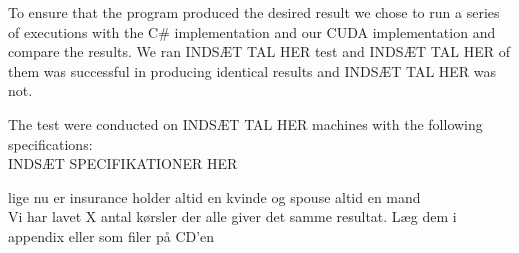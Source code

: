 To ensure that the program produced the desired result we chose to run a series of executions with the C\# implementation and our CUDA implementation and compare the results. We ran INDSÆT TAL HER test and INDSÆT TAL HER of them was successful in producing identical results and INDSÆT TAL HER was not. 

The test were conducted on INDSÆT TAL HER machines with the following specifications:\\
INDSÆT SPECIFIKATIONER HER


lige nu er insurance holder altid en kvinde og spouse altid en mand \\

Vi har lavet X antal kørsler der alle giver det samme resultat. Læg dem i appendix eller som filer på CD'en
